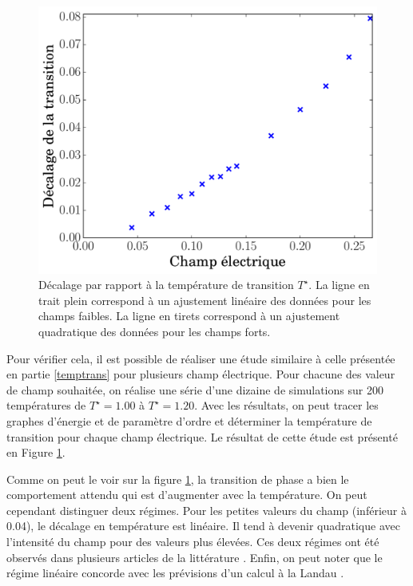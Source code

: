 \documentclass[11pt,a4paper]{article}
\numberwithin{equation}{section}
\begin{document}
\begin{figure}[h!]
    \centering      
    \includegraphics[scale=0.6]{figures/electricField.pdf}
    \caption{Décalage par rapport à la température de transition $T^\star$. La ligne en trait plein correspond à un ajustement linéaire des données pour les champs faibles. La ligne en tirets correspond à un ajustement quadratique des données pour les champs forts.}
        \label{electricField} 
\end{figure}

\newpage

Pour vérifier cela, il est possible de réaliser une étude similaire à celle présentée en partie \ref{temptrans} pour plusieurs champ électrique. Pour chacune des valeur de champ souhaitée, on réalise une série d'une dizaine de simulations sur 200 températures de $T^\star = 1.00$ à $T^\star = 1.20$. Avec les résultats, on peut tracer les graphes d'énergie et de paramètre d'ordre et déterminer la température de transition pour chaque champ électrique. Le résultat de cette étude est présenté en Figure \ref{electricField}.
\medskip

Comme on peut le voir sur la figure \ref{electricField}, la transition de phase a bien le comportement attendu qui est d'augmenter avec la température. On peut cependant distinguer deux régimes. Pour les petites valeurs du champ (inférieur à 0.04), le décalage en température est linéaire. Il tend à devenir quadratique avec l'intensité du champ pour des valeurs plus élevées. Ces deux régimes ont été observés dans plusieurs articles de la littérature \cite{entropicelectric, field}. Enfin, on peut noter que le régime linéaire concorde avec les prévisions d'un calcul à la Landau \cite{landau}.
\end{document}
